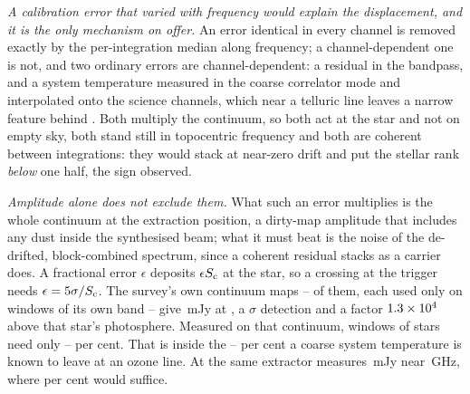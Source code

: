 \emph{A calibration error that varied with frequency would explain the
displacement, and it is the only mechanism on offer.} An error identical in
every channel is removed exactly by the per-integration median along
frequency; a channel-dependent one is not, and two ordinary errors are
channel-dependent: a residual in the bandpass, and a system temperature
measured in the coarse correlator mode and interpolated onto the science
channels, which near a telluric line leaves a narrow feature behind
\citep{ALMATsys2018}. Both
multiply the continuum, so both act at the star and not on empty sky, both
stand still in topocentric frequency and both are coherent between
integrations: they would stack at near-zero drift and put the stellar rank
\emph{below} one half, the sign observed.

\emph{Amplitude alone does not exclude them.} What such an error multiplies
is the whole continuum at the extraction position, a dirty-map amplitude that
includes any dust inside the synthesised beam; what it must beat is the noise
of the de-drifted, block-combined spectrum, since a coherent residual stacks
as a carrier does. A fractional error $\epsilon$ deposits $\epsilon S_{\rm c}$
at the star, so a crossing at the trigger needs $\epsilon=5\sigma/S_{\rm c}$.
The survey's own continuum maps -- \CxNMap{} of them, each used only on
windows of its own band -- give \CxContMax\,mJy at \CxContMaxStar, a
\CxContMaxSnr$\sigma$ detection and a factor $1.3\times10^{4}$ above that star's
photosphere. Measured on that continuum, \CxNAdmit{} windows of
\CxNAdmitStar{} stars need only \CxEpsAdmitLoPct--\CxEpsAdmitHiPct{} per
cent. That is inside the \CdSpecTsysLo--\CdSpecTsysHi{} per cent a coarse
system temperature is known to leave at an ozone line. At \CxAuStar{} the
same extractor measures \CxAuContMJy\,mJy near \CxAuGHz\,GHz, where
\CxAuEpsPct{} per cent would suffice.

